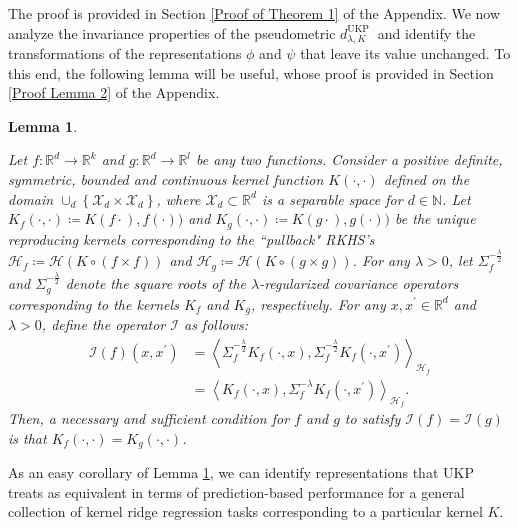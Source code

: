 \documentclass[11pt]{article}
\newcommand{\R}{\mathbb{R}}
\newcommand{\Hil}{\mathcal{H}}
\newcommand{\repone}{\phi}
\newcommand{\reptwo}{\psi}
\newcommand{\Hf}{\mathcal{H}_{f}}
\newcommand{\Hg}{\mathcal{H}_{g}}
\newcommand{\inprod}[1]{\left \langle #1 \right\rangle}
\newcommand{\metricstname}{UKP }
\theoremstyle{plain}
\newcounter{lemmano}
\newtheorem{lemma}[lemmano]{Lemma}
\begin{document}
The proof is provided in Section \ref{Proof of Theorem 1} of the Appendix. We now analyze the invariance properties of the pseudometric $d_{\lambda,K}^{\text{\metricstname}}$ and identify the transformations of the representations $\repone$ and $\reptwo$ that leave its value unchanged. To this end, the following lemma will be useful, whose proof is provided in Section \ref{Proof Lemma 2} of the Appendix.

\begin{lemma}\label{Invariance of regularized kernel inner product}

Let $f: \R^d \to \R^k$ and $g: \R^d \to \R^l$ be any two functions. Consider a positive definite, symmetric, bounded and continuous kernel function $K(\cdot,\cdot)$ defined on the domain $\cup_{d} \left\{\mathcal{X}_{d} \times \mathcal{X}_{d}\right\}$, where $\mathcal{X}_{d} \subset \mathbb{R}^{d}$ is a separable space for $d \in \mathbb{N}$. Let $K_{f}(\cdot,\cdot) \coloneq K(f\cdot),f(\cdot))$ and $K_{g}(\cdot,\cdot) \coloneq K(g\cdot),g(\cdot))$ be the unique reproducing kernels corresponding to the ``pullback" RKHS's $\Hf \coloneq \Hil\left(K \circ \left(f \times f\right)\right)$ and $\Hg \coloneq \Hil\left(K \circ \left(g \times g\right)\right)$. For any $\lambda>0$, let $\Sigma_{f}^{-\frac{\lambda}{2}}$ and $\Sigma_{g}^{-\frac{\lambda}{2}}$ denote the square roots of the $\lambda$-regularized covariance operators corresponding to the kernels $K_{f}$ and $K_{g}$, respectively. For any $x,x^{\prime} \in \mathbb{R}^{d}$ and $\lambda>0$, define the operator $\mathcal{I}$ as follows: 
\[
\begin{aligned}
\mathcal{I}(f)(x,x^{\prime}) &= \inprod{\Sigma_{f}^{-\frac{\lambda}{2}}K_{f}(\cdot,x),\Sigma_{f}^{-\frac{\lambda}{2}}K_{f}(\cdot,x^{\prime})}_{\Hf} \\
& = \inprod{K_{f}(\cdot,x),\Sigma_{f}^{-\lambda}K_{f}(\cdot,x^{\prime})}_{\Hf}. 
\end{aligned}
\]
Then, a necessary and sufficient condition for $f$ and $g$ to satisfy $ \mathcal{I}(f) = \mathcal{I}(g)$ is that $ K_{f}(\cdot, \cdot) = K_{g}(\cdot, \cdot)$. 
\end{lemma}

As an easy corollary of Lemma \ref{Invariance of regularized kernel inner product}, we can identify representations that \metricstname treats as equivalent in terms of prediction-based performance for a general collection of kernel ridge regression tasks corresponding to a particular kernel $K$.
\end{document}

